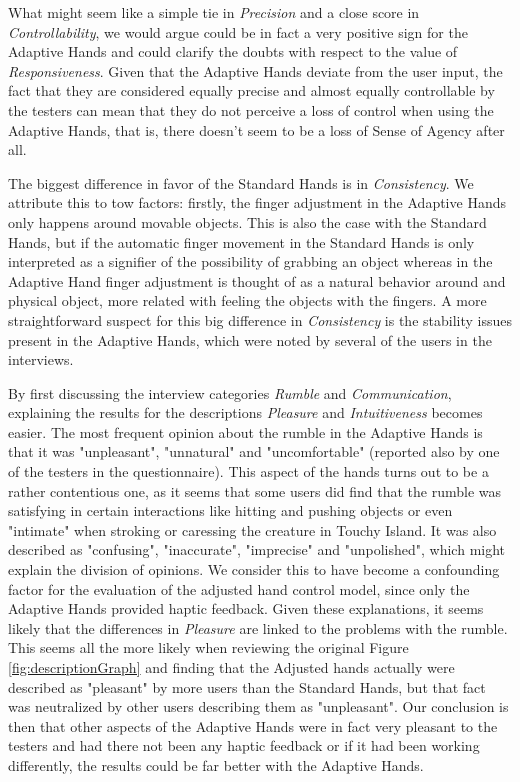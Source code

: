 What might seem like a simple tie in \textit{Precision} and a close score in \textit{Controllability}, we would argue could be in fact a very positive sign for the Adaptive Hands and could clarify the doubts with respect to the value of \textit{Responsiveness}. Given that the Adaptive Hands deviate from the user input, the fact that they are considered equally precise and almost equally controllable by the testers can mean that they do not perceive a loss of control when using the Adaptive Hands, that is, there doesn't seem to be a loss of Sense of Agency after all.

The biggest difference in favor of the Standard Hands is in \textit{Consistency}. We attribute this to tow factors: firstly, the finger adjustment in the Adaptive Hands only happens around movable objects. This is also the case with the Standard Hands, but if the automatic finger movement in the Standard Hands is only interpreted as a signifier of the possibility of grabbing an object whereas in the Adaptive Hand finger adjustment is thought of as a natural behavior around and physical object, more related with feeling the objects with the fingers. A more straightforward suspect for this big difference in \textit{Consistency} is the stability issues present in the Adaptive Hands, which were noted by several of the users in the interviews.

By first discussing the interview categories \textit{Rumble} and \textit{Communication}, explaining the results for the descriptions \textit{Pleasure} and \textit{Intuitiveness} becomes easier. The most frequent opinion about the rumble in the Adaptive Hands is that it was "unpleasant", "unnatural" and "uncomfortable" (reported also by one of the testers in the questionnaire). This aspect of the hands turns out to be a rather contentious one, as it seems that some users did find that the rumble was satisfying in certain interactions like hitting and pushing objects or even "intimate" when stroking or caressing the creature in Touchy Island. It was also described as "confusing", "inaccurate", "imprecise" and "unpolished", which might explain the division of opinions. We consider this to have become a confounding factor for the evaluation of the adjusted hand control model, since only the Adaptive Hands provided haptic feedback. Given these explanations, it seems likely that the differences in \textit{Pleasure} are linked to the problems with the rumble. This seems all the more likely when reviewing the original Figure \ref{fig:descriptionGraph} and finding that the Adjusted hands actually were described as "pleasant" by more users than the Standard Hands, but that fact was neutralized by other users describing them as "unpleasant". Our conclusion is then that other aspects of the Adaptive Hands were in fact very pleasant to the testers and had there not been any haptic feedback or if it had been working differently, the results could be far better with the Adaptive Hands.

